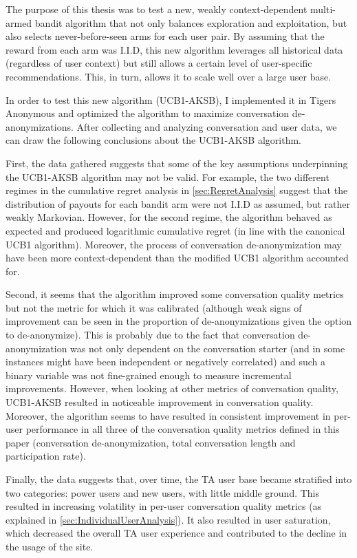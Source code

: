 The purpose of this thesis was to test a new, weakly context-dependent multi-armed bandit algorithm that not only balances exploration and exploitation, but also selects never-before-seen arms for each user pair. By assuming that the reward from each arm was I.I.D, this new algorithm leverages all historical data (regardless of user context) but still allows a certain level of user-specific recommendations. This, in turn, allows it to scale well over a large user base.

In order to test this new algorithm (UCB1-AKSB), I implemented it in Tigers Anonymous and optimized the algorithm to maximize conversation de-anonymizations. After collecting and analyzing conversation and user data, we can draw the following conclusions about the UCB1-AKSB algorithm.

First, the data gathered suggests that some of the key assumptions underpinning the UCB1-AKSB algorithm may not be valid. For example, the two different regimes in the cumulative regret analysis in \autoref{sec:RegretAnalysis} suggest that the distribution of payouts for each bandit arm were not I.I.D as assumed, but rather weakly Markovian. However, for the second regime, the algorithm behaved as expected and produced logarithmic cumulative regret (in line with the canonical UCB1 algorithm). Moreover, the process of conversation de-anonymization may have been more context-dependent than the modified UCB1 algorithm accounted for. 

Second, it seems that the algorithm improved some conversation quality metrics but not the metric for which it was calibrated (although weak signs of improvement can be seen in the proportion of de-anonymizations given the option to de-anonymize). This is probably due to the fact that conversation de-anonymization was not only dependent on the conversation starter (and in some instances might have been independent or negatively correlated) and such a binary variable was not fine-grained enough to measure incremental improvements. However, when looking at other metrics of conversation quality, UCB1-AKSB resulted in noticeable improvement in conversation quality. Moreover, the algorithm seems to have resulted in consistent improvement in per-user performance in all three of the conversation quality metrics defined in this paper (conversation de-anonymization, total conversation length and participation rate).

Finally, the data suggests that, over time, the TA user base became stratified into two categories: power users and new users, with little middle ground. This resulted in increasing volatility in per-user conversation quality metrics (as explained in \autoref{sec:IndividualUserAnalysis}). It also resulted in user saturation, which decreased the overall TA user experience and contributed to the decline in the usage of the site.

